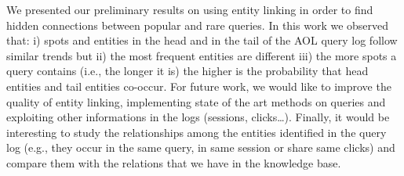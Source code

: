 We presented our preliminary results on using entity linking in order
to find hidden connections between popular and rare queries. 
In this work we observed that: i) spots and entities 
in the head and in the tail of the AOL query log follow similar trends but ii) 
the most frequent entities are different iii) the more spots a query contains 
(i.e., the longer it is) the higher is the probability that head entities and
tail entities co-occur. For future work, we would like to improve the quality 
of entity linking, implementing state of the art methods on queries and
exploiting other informations in the logs (sessions, clicks\dots). Finally, it would 
be interesting to study the relationships among the entities identified in the query log
(e.g., they occur in the same query, in same session or share same clicks) and
compare them with the relations that we have in the knowledge base.
